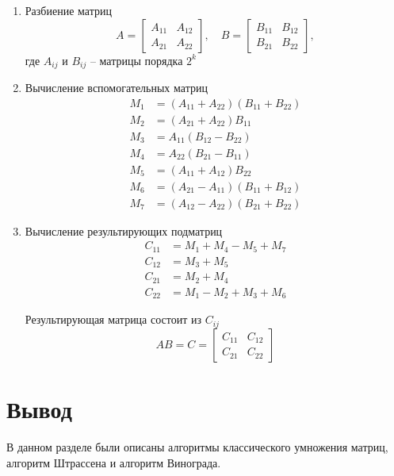 \begin{enumerate}
	\item Разбиение матриц
	\begin{equation}
		\label{eq:mat_split}
	A = \begin{bmatrix} A_{11} & A_{12} \\ A_{21} & A_{22} \end{bmatrix}, \quad
	B = \begin{bmatrix} B_{11} & B_{12} \\ B_{21} & B_{22} \end{bmatrix}
	,
	\end{equation} где $A_{ij}$ и $B_{ij}$ -- матрицы порядка $2^{k}$
	
	\item Вычисление вспомогательных матриц
	\begin{equation}
		\label{eq:help_mat}
	\begin{aligned}
		M_1 &= (A_{11} + A_{22})(B_{11} + B_{22}) \\
		M_2 &= (A_{21} + A_{22})B_{11} \\
		M_3 &= A_{11}(B_{12} - B_{22}) \\
		M_4 &= A_{22}(B_{21} - B_{11}) \\
		M_5 &= (A_{11} + A_{12})B_{22} \\
		M_6 &= (A_{21} - A_{11})(B_{11} + B_{12}) \\
		M_7 &= (A_{12} - A_{22})(B_{21} + B_{22})
	\end{aligned}
	\end{equation}
	
	\item Вычисление результирующих подматриц
	\begin{equation}
		\label{eq:res_submat}
	\begin{aligned}
		C_{11} &= M_1 + M_4 - M_5 + M_7 \\
		C_{12} &= M_3 + M_5 \\
		C_{21} &= M_2 + M_4 \\
		C_{22} &= M_1 - M_2 + M_3 + M_6
	\end{aligned}
	\end{equation}
		
	Результирующая матрица состоит из $C_{ij}$
	\begin{equation}
		\label{eq:res_mat_str}
		AB = C = \begin{bmatrix} C_{11} & C_{12} \\ C_{21} & C_{22} \end{bmatrix}
	\end{equation}
		
\end{enumerate}


\section*{Вывод}
В данном разделе были описаны алгоритмы классического умножения матриц, алгоритм Штрассена и алгоритм Винограда.